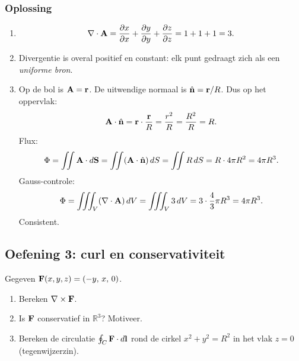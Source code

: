 \documentclass[11pt,a4paper]{article}
\begin{document}
    \subsubsection*{Oplossing}
    \begin{enumerate}
        \item
        \[
            \nabla\cdot\vb{A}=\pdv{x}{x}+\pdv{y}{y}+\pdv{z}{z}=1+1+1=3.
        \]
        \item Divergentie is overal positief en constant: elk punt gedraagt zich als een \emph{uniforme bron}.
        \item Op de bol is \(\vb{A}=\vb{r}\). De uitwendige normaal is \(\hat{\vb{n}}=\vb{r}/R\).
        Dus op het oppervlak:
        \[
            \vb{A}\cdot \hat{\vb{n}} = \vb{r}\cdot \frac{\vb{r}}{R}=\frac{r^2}{R}=\frac{R^2}{R}=R.
        \]
        Flux:
        \[
            \Phi = \iint \vb{A}\cdot d\vb{S} = \iint (\vb{A}\cdot\hat{\vb{n}})\, dS = \iint R\, dS = R \cdot 4\pi R^2 = 4\pi R^3.
        \]
        Gauss-controle:
        \[
            \Phi = \iiint_V (\nabla\cdot \vb{A})\, dV = \iiint_V 3\, dV = 3\cdot \frac{4}{3}\pi R^3 = 4\pi R^3.
        \]
        Consistent.
    \end{enumerate}


    \subsection{Oefening 3: curl en conservativiteit}
    Gegeven \(\vb{F}(x,y,z)=(-y,\,x,\,0)\).
    \begin{enumerate}
        \item Bereken \(\nabla\times \vb{F}\).
        \item Is \(\vb{F}\) conservatief in \(\mathbb{R}^3\)? Motiveer.
        \item Bereken de circulatie \(\oint_C \vb{F}\cdot d\vb{l}\) rond de cirkel \(x^2+y^2=R^2\) in het vlak \(z=0\) (tegenwijzerzin).
    \end{enumerate}
\end{document}
